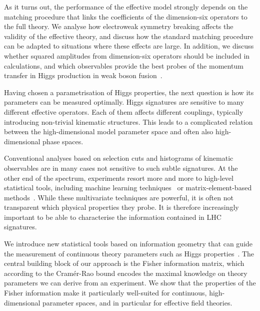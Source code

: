 As it turns out, the performance of the effective model strongly
depends on the matching procedure that links the coefficients of the
dimension-six operators to the full theory. We analyse how electroweak
symmetry breaking affects the validity of the effective theory, and
discuss how the standard matching procedure can be adapted to
situations where these effects are large. In addition, we discuss
whether squared amplitudes from dimension-six operators should be
included in calculations, and which observables provide the best
probes of the momentum transfer in Higgs production in weak boson
fusion~\cite{Biekotter:2016ecg}.

\newparagraph
%
Having chosen a parametrisation of Higgs properties, the next question
is how its parameters can be measured optimally. Higgs
signatures are sensitive to many different effective operators. Each
of them affects different couplings, typically introducing non-trivial
kinematic structures. This leads to a complicated relation between the
high-dimensional model parameter space and often also high-dimensional
phase spaces.

Conventional analyses based on selection cuts and histograms of
kinematic observables are in many cases not sensitive to such subtle
signatures.  At the other end of the spectrum, experiments resort more
and more to high-level statistical tools, including machine learning
techniques~\cite{Cranmer:2015bka, Louppe:2016ylz, Louppe:2016aov,
  Cranmer:2016lzt, Baldi:2016fzo, Brehmer:ghost_probability,
  Cogan:2014oua, Baldi:2014pta, deOliveira:2015xxd, Almeida:2015jua,
  Baldi:2016fql, Guest:2016iqz, Komiske:2016rsd, Kasieczka:2017nvn,
  Louppe:2017ipp, Baldi:2014kfa, Searcy:2015apa, Santos:2016kno,
  Alves:2016htj, Buckley:2011kc, Bornhauser:2013aya, Bechtle:2017vyu}
or matrix-element-based methods~\cite{Kondo:1988yd, Abazov:2004cs,
  Gao:2010qx, Alwall:2010cq, Avery:2012um, Andersen:2012kn,
  Campbell:2013hz, Artoisenet:2013vfa, Martini:2015fsa,
  Gritsan:2016hjl, Soper:2011cr, Soper:2012pb, Soper:2014rya,
  Atwood:1991ka, Davier:1992nw, Diehl:1993br}. While these
multivariate techniques are powerful, it is often not transparent
which physical properties they probe. It is therefore increasingly
important to be able to characterise the information contained in LHC
signatures.

We introduce new statistical tools based on information geometry that
can guide the measurement of continuous theory parameters such as Higgs
properties~\cite{Brehmer:2016nyr}. The central building block of our
approach is the Fisher information matrix, which according to the
Cram\'er-Rao bound encodes the maximal knowledge on theory parameters
we can derive from an experiment. We show that the properties of the
Fisher information make it particularly well-suited for continuous,
high-dimensional parameter spaces, and in particular for effective
field theories.

